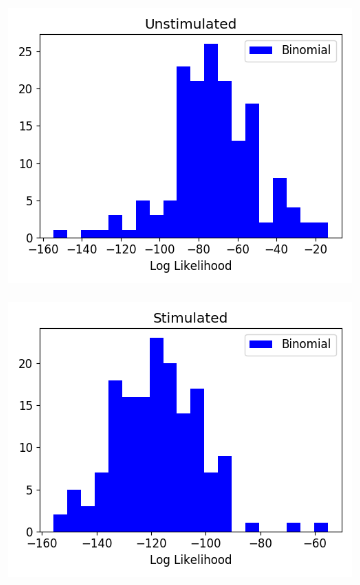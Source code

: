     \begin{figure}[p]
      \begin{subfigure}[h]{0.5\linewidth}
        \includegraphics[width=\linewidth]{figures/conway_maxwell/v1_binom_1ms_unstimulated_log_likelihood_hist.png}
        \label{fig:v1_binom_1ms_unstimulated_log_likelihood_hist}
      \end{subfigure}
      \begin{subfigure}[h]{0.5\linewidth}
        \includegraphics[width=\linewidth]{figures/conway_maxwell/v1_binom_1ms_stimulated_log_likelihood_hist.png}

\end{subfigure}
\end{figure}

